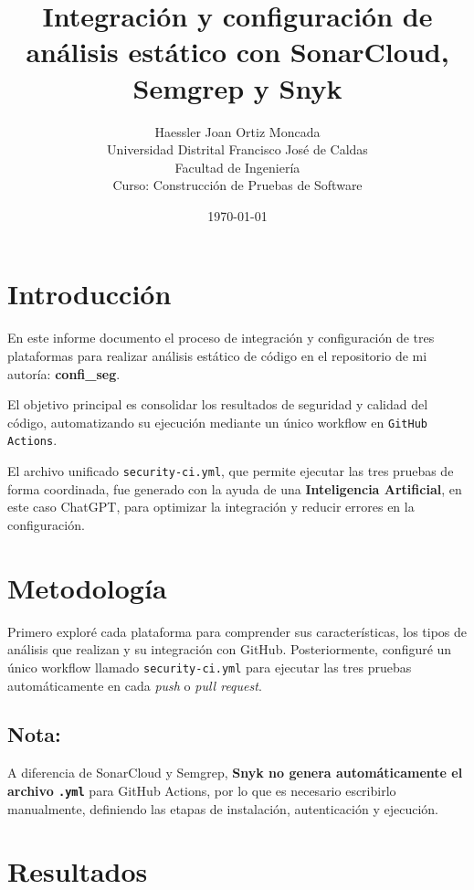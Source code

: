 \documentclass[12pt, a4paper]{article}
\title{\textbf{Integración y configuración de análisis estático con SonarCloud, Semgrep y Snyk}}
\author{Haessler Joan Ortiz Moncada \\[0.5cm]
        Universidad Distrital Francisco José de Caldas \\
        Facultad de Ingeniería \\
        Curso: Construcción de Pruebas de Software}
\date{\today}
\begin{document}
\maketitle

\section{Introducción}

En este informe documento el proceso de integración y configuración de tres plataformas para realizar 
análisis estático de código en el repositorio de mi autoría: \textbf{confi\_seg}.  

El objetivo principal es consolidar los resultados de seguridad y calidad del código, 
automatizando su ejecución mediante un único workflow en \texttt{GitHub Actions}.  

El archivo unificado \texttt{security-ci.yml}, que permite ejecutar las tres pruebas de forma coordinada, 
fue generado con la ayuda de una \textbf{Inteligencia Artificial}, en este caso ChatGPT, 
para optimizar la integración y reducir errores en la configuración.

\section{Metodología}
Primero exploré cada plataforma para comprender sus características, los tipos de análisis que realizan y su 
integración con GitHub. Posteriormente, configuré un único workflow llamado \texttt{security-ci.yml} para ejecutar 
las tres pruebas automáticamente en cada \textit{push} o \textit{pull request}.  

\subsection*{Nota:}
A diferencia de SonarCloud y Semgrep, \textbf{Snyk no genera automáticamente el archivo \texttt{.yml}} para GitHub 
Actions, por lo que es necesario escribirlo manualmente, definiendo las etapas de instalación, autenticación y ejecución.

\section{Resultados}
\end{document}
